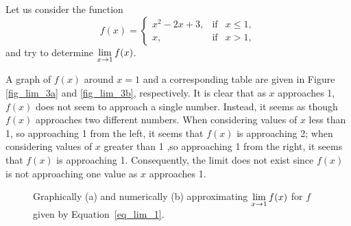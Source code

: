 \begin{example}
Let us consider the function
\begin{equation}
f(x) = \left\{\begin{array}{lcl} x^2-2x+3, &\mbox{if} & x\leq 1, \\ x, &\mbox{if} & x>1, \end{array}\right.
\label{eq_lim_1}
\end{equation}
and try to determine $\displaystyle\lim_{x\to 1} f(x)$.



A graph of $f(x)$ around $x=1$ and a corresponding table are given in Figure \ref{fig_lim_3a} and \ref{fig_lim_3b}, respectively. It is clear that as $x$ approaches 1, $f(x)$ does not seem to approach a single number. Instead, it seems as though $f(x)$ approaches two different numbers. When considering values of $x$ less than 1, so approaching 1 from the left, it seems that $f(x)$ is approaching 2; when considering values of $x$ greater than 1 ,so approaching 1 from the right, it seems that $f(x)$ is approaching 1. Consequently, the limit does not exist since $f(x)$ is not approaching one value as $x$ approaches 1.



\begin{figure}[H]
  \centering
  \qquad
\caption{Graphically (a) and numerically (b) approximating $\displaystyle\lim_{x\to 1} f(x)$ for $f$ given by Equation~\eqref{eq_lim_1}.}
\end{figure}

\end{example}


